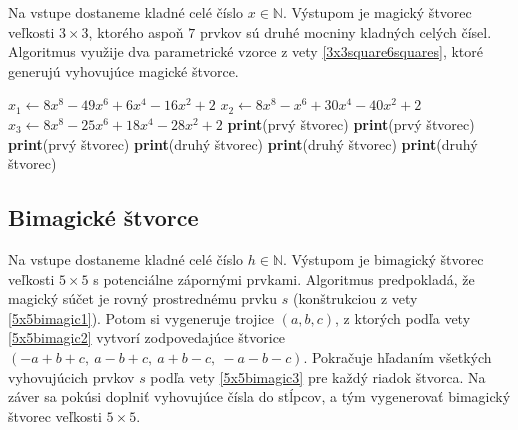 \begin{alg}
\label{algsquare3x3x}
Na vstupe dostaneme kladné celé číslo $x \in \mathbb{N}$. Výstupom je magický štvorec veľkosti $3 \times 3$, ktorého aspoň $7$ prvkov sú druhé mocniny kladných celých čísel. Algoritmus využije dva parametrické vzorce z vety \ref{3x3square6squares}, ktoré generujú vyhovujúce magické štvorce.
\end{alg}

\begin{algorithmic}
\STATE $x_1 \gets 8x^8 - 49x^6 + 6x^4 - 16x^2 + 2$
\STATE $x_2 \gets 8x^8 - x^6 + 30x^4 - 40x^2 + 2$
\STATE $x_3 \gets 8x^8 - 25x^6 + 18x^4 - 28x^2 + 2$
    \STATE \textbf{print}(prvý štvorec)
\ENDIF
{}
    \STATE \textbf{print}(prvý štvorec)
\ENDIF
{}
    \STATE \textbf{print}(prvý štvorec)
\ENDIF
{}
    \STATE \textbf{print}(druhý štvorec)
\ENDIF
{}
    \STATE \textbf{print}(druhý štvorec)
\ENDIF
{}
    \STATE \textbf{print}(druhý štvorec)
\ENDIF
\end{algorithmic}

\subsection{Bimagické štvorce}

\begin{alg}
\label{algsquare5x5b}
Na vstupe dostaneme kladné celé číslo $h \in \mathbb{N}$. Výstupom je bimagický štvorec veľkosti $5 \times 5$ s potenciálne zápornými prvkami. Algoritmus predpokladá, že magický súčet je rovný prostrednému prvku $s$ (konštrukciou z vety \ref{5x5bimagic1}). Potom si vygeneruje trojice $(a,b,c)$, z ktorých podľa vety \ref{5x5bimagic2} vytvorí zodpovedajúce štvorice $(-a+b+c,~a-b+c,~a+b-c,~-a-b-c)$. Pokračuje hľadaním všetkých vyhovujúcich prvkov $s$ podľa vety \ref{5x5bimagic3} pre každý riadok štvorca. Na záver sa pokúsi doplniť vyhovujúce čísla do stĺpcov, a tým vygenerovať bimagický štvorec veľkosti $5 \times 5$.
\end{alg}

